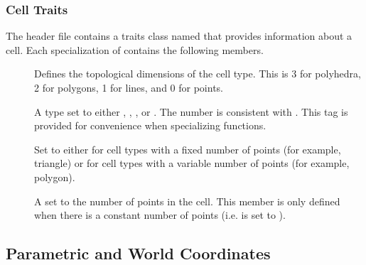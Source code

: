 
\subsubsection{Cell Traits}


The  header file contains a traits class
named  that provides information about a cell. Each
specialization of  contains the following
members.

\begin{description}
\item[] Defines the topological
  dimensions of the cell type. This is 3 for polyhedra, 2 for polygons, 1
  for lines, and 0 for points.
\item[] A type set to either
  ,
  ,
  , or
  . The number
  is consistent with . This tag is
  provided for convenience when specializing functions.
\item[] Set to either 
  for cell types with a fixed number of points (for example, triangle) or
   for cell types with a variable number of
  points (for example, polygon).
\item[] A  set to the number of
  points in the cell. This member is only defined when there is a constant
  number of points (i.e.  is set to
  ).
\end{description}




\subsection{Parametric and World Coordinates}

